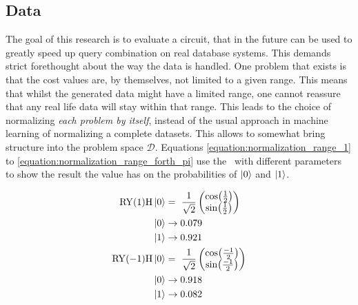 \subsection{Data}

The goal of this research is to evaluate a circuit, that in the future can be used to greatly speed up query combination on real database systems. This demands strict forethought about the way the data is handled. One problem that exists is that the cost values are, by themselves, not limited to a given range. This means that whilst the generated data might have a limited range, one cannot reassure that any real life data will stay within that range. This leads to the choice of normalizing \emph{each problem by itself}, instead of the usual approach in machine learning of normalizing a complete datasets. This allows to somewhat bring structure into the problem space $\mathcal{D}$. Equations \ref{equation:normalization_range_1} to \ref{equation:normalization_range_forth_pi} use the \rygate\ with different parameters to show the result the value has on the probabilities of $\ket{0}$ and $\ket{1}$.

\begin{equation}
    \centering
    \begin{split}
        \mathrm{RY}(1)\mathrm{H}\ket{0} &=\ \frac{1}{\sqrt{2}}\begin{pmatrix}\cos(\frac{1}{2}) \\ \sin(\frac{1}{2})\end{pmatrix}\\
        \ket{0} &\to 0.079 \\
        \ket{1} &\to 0.921 \\
        \mathrm{RY}(-1)\mathrm{H}\ket{0} &=\ \frac{1}{\sqrt{2}}\begin{pmatrix}\cos(\frac{-1}{2}) \\ \sin(\frac{-1}{2})\end{pmatrix}\\
        \ket{0} &\to 0.918 \\
        \ket{1} &\to 0.082 \\
    \end{split}
    \label{equation:normalization_range_1}
\end{equation}

